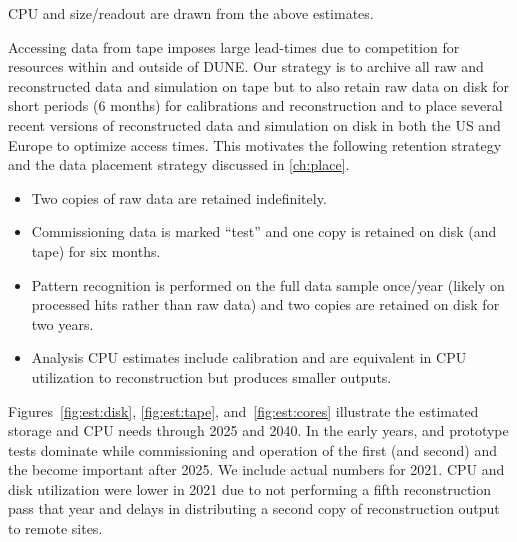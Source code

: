 \documentclass[../main-v1.tex]{subfiles}
\begin{document}
CPU and size/readout are drawn from the above estimates. 

Accessing data from tape imposes large lead-times due to competition for resources within and outside of DUNE.  Our strategy is to archive all raw and reconstructed data and simulation on tape but to also retain raw data on disk for short periods (6 months) for calibrations and reconstruction and to place several recent versions of reconstructed data and simulation on disk in both the US and Europe to optimize access times.  This motivates the following retention strategy and the data placement strategy discussed in \ref{ch:place}. 

\begin{itemize}
\item Two copies of raw data are retained indefinitely.
\item Commissioning data is marked ``test'' and one copy is retained on disk (and tape) for six months. 
\item Pattern recognition is performed on the full data sample once/year (likely on processed hits rather than raw data)  and two copies are retained on disk for two years.  
\item Analysis CPU estimates include calibration and are  equivalent in CPU utilization to reconstruction but produces smaller outputs. 
\end{itemize}

Figures~\ref{fig:est:disk}, \ref{fig:est:tape}, and~\ref{fig:est:cores} illustrate the estimated storage and CPU needs through 2025 and 2040.  In the early years,  %
and  prototype tests dominate while commissioning and operation of the first (and second)  and the  become important after 2025. We include actual numbers for 2021. CPU and disk utilization were lower in 2021 due to not performing a fifth reconstruction pass that year %
and delays in distributing a second copy of reconstruction output to remote sites. 
\end{document}
